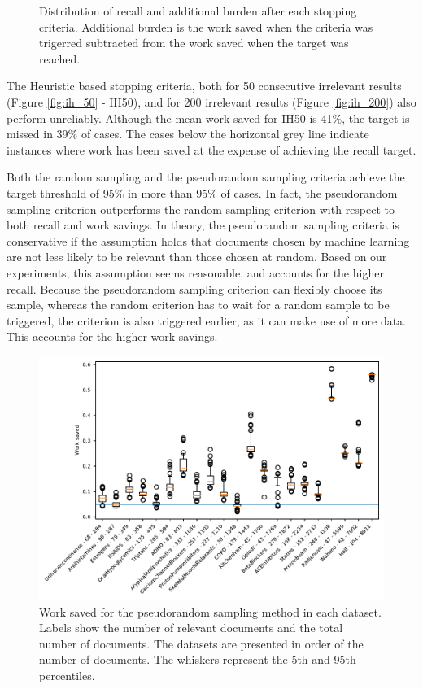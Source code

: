 \documentclass{bmcart}
\begin{document}
\begin{figure}
	\caption{\small Distribution of recall and additional burden after each stopping criteria. Additional burden is the work saved when the criteria was trigerred subtracted from the work saved when the target was reached.} 
	\label{recall-burden}
\end{figure}


	The Heuristic based stopping criteria, both for 50 consecutive irrelevant results (Figure \ref{fig:ih_50} - IH50), and for 200 irrelevant results (Figure \ref{fig:ih_200}) also perform unreliably. Although the mean work saved for IH50 is 41\%, the target is missed in 39\% of cases. The cases below the horizontal grey line indicate instances where work has been saved at the expense of achieving the recall target.
	
	Both the random sampling and the pseudorandom sampling criteria achieve the target threshold of 95\% in more than 95\% of cases. In fact, the pseudorandom sampling criterion  outperforms the random sampling criterion with respect to both recall and work savings. In theory, the pseudorandom sampling criteria is conservative if the assumption holds that documents chosen by machine learning are not less likely to be relevant than those chosen at random. Based on our experiments, this assumption seems reasonable, and accounts for the higher recall. Because the pseudorandom sampling criterion can flexibly choose its sample, whereas the random criterion has to wait for a random sample to be triggered, the criterion is also triggered earlier, as it can make use of more data. This accounts for the higher work savings.
	
	\begin{figure}
		\includegraphics[width=0.9\linewidth]{../images/wss_nrs}
		\caption{Work saved for the pseudorandom sampling method in each dataset. Labels show the number of relevant documents and the total number of documents. The datasets are presented in order of the number of documents. The whiskers represent the 5th and 95th percentiles.}
		\label{wss}
	\end{figure}
	
\end{document}
